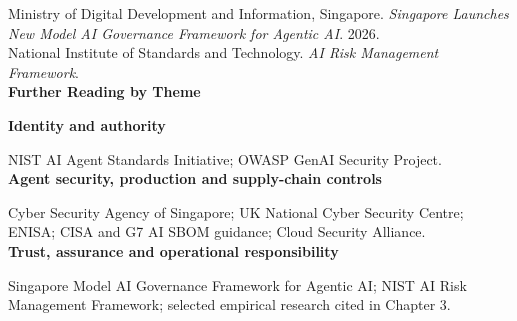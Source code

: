 \documentclass[10pt,twoside]{article}
\begin{document}
Ministry of Digital Development and Information, Singapore. \emph{Singapore Launches New Model AI Governance Framework for Agentic AI}. 2026.\\
National Institute of Standards and Technology. \emph{AI Risk Management Framework}.\\[18pt]
{\sffamily\bfseries\large Further Reading by Theme}\par\vspace{8pt}
{\sffamily\bfseries Identity and authority}\par NIST AI Agent Standards Initiative; OWASP GenAI Security Project.\\[6pt]
{\sffamily\bfseries Agent security, production and supply-chain controls}\par Cyber Security Agency of Singapore; UK National Cyber Security Centre; ENISA; CISA and G7 AI SBOM guidance; Cloud Security Alliance.\\[6pt]
{\sffamily\bfseries Trust, assurance and operational responsibility}\par Singapore Model AI Governance Framework for Agentic AI; NIST AI Risk Management Framework; selected empirical research cited in Chapter 3.\\
\end{document}
